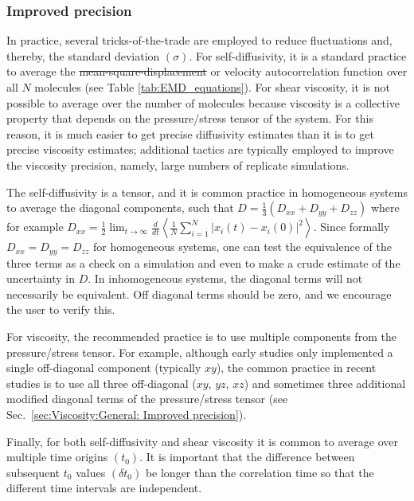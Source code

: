\documentclass[9pt,bestpractices]{livecoms}
\providecommand{\DIFadd}[1]{{\protect\color{blue}\uwave{#1}}} %
\providecommand{\DIFdel}[1]{{\protect\color{red}\sout{#1}}}                      %
\providecommand{\DIFaddbegin}{} %
\providecommand{\DIFaddend}{} %
\providecommand{\DIFdelbegin}{} %
\providecommand{\DIFdelend}{} %
\begin{document}
\subsubsection{Improved precision} \label{sec:General: Improve precision}

In practice, several tricks-of-the-trade are employed to reduce fluctuations and, thereby, the standard deviation $(\sigma)$. For self-diffusivity, it is a standard practice to average the \DIFdelbegin \DIFdel{mean-square-displacement }\DIFdelend \DIFaddbegin \DIFadd{mean squared displacement }\DIFaddend or velocity autocorrelation function over all $N$ molecules (see Table \ref{tab:EMD_equations}). For shear viscosity, it is not possible to average over the number of molecules because viscosity is a collective property that depends on the pressure/stress tensor of the system. For this reason, it is much easier to get precise diffusivity estimates than it is to get precise viscosity estimates; additional tactics are typically employed to improve the viscosity precision, namely, large numbers of replicate simulations.

The self-diffusivity is a tensor, and it is common practice in homogeneous systems to average the diagonal components, such that $D = \frac{1}{3} (D_{xx} + D_{yy} + D_{zz})$ where for example $ D_{xx}=\displaystyle \frac{1}{2} \lim_{t\to\infty} \frac{d}{dt} \left\langle \frac{1}{N} \sum_{i=1}^{N} |x_i(t)-x_i(0)|^2 \right\rangle$. Since formally $D_{xx}=D_{yy}=D_{zz}$ for homogeneous systems, one can test the equivalence of the three terms as a check on a simulation and even to make a crude estimate of the uncertainty in $D$. In inhomogeneous systems, the diagonal terms will not necessarily be equivalent. Off diagonal terms should be zero, and we encourage the user to verify this.

For viscosity, the recommended practice is to use multiple components from the pressure/stress tensor. For example, although early studies only implemented a single off-diagonal component (typically $xy$), the common practice in recent studies is to use all three off-diagonal ($xy$, $yz$, $xz$) and sometimes three additional modified diagonal terms of the pressure/stress tensor (see Sec.\ \ref{sec:Viscosity:General: Improved precision}).

Finally, for both self-diffusivity and shear viscosity it is common to average over multiple time origins $(t_0)$. It is important that the difference between subsequent $t_0$ values $(\delta t_0)$ be longer than the correlation time so that the different time intervals are independent.
\end{document}
